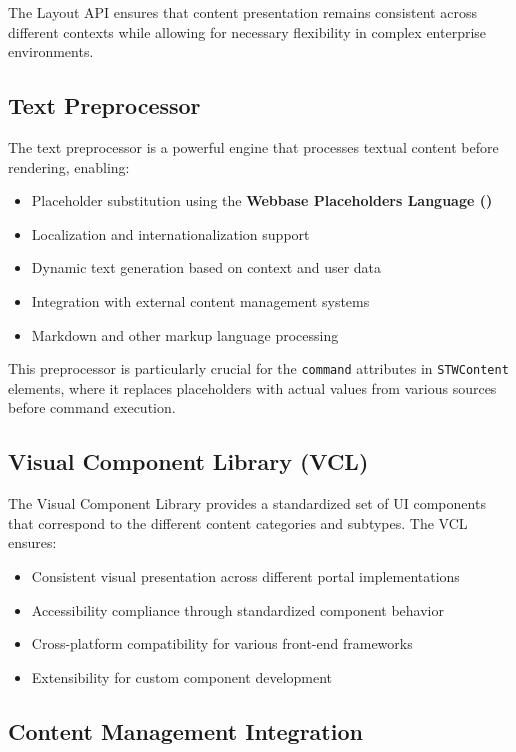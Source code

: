 The Layout API ensures that content presentation remains consistent across different contexts while allowing for necessary flexibility in complex enterprise environments.

\subsection{Text Preprocessor}
\label{sec:text-preprocessor}

The \wbol{} text preprocessor is a powerful engine that processes textual content before rendering, enabling:

\begin{itemize}
\item Placeholder substitution using the \textbf{Webbase Placeholders Language (\wbpl{})}
\item Localization and internationalization support
\item Dynamic text generation based on context and user data
\item Integration with external content management systems
\item Markdown and other markup language processing
\end{itemize}

This preprocessor is particularly crucial for the \texttt{command} attributes in \texttt{STWContent} elements, where it replaces placeholders with actual values from various sources before command execution.

\subsection{Visual Component Library (VCL)}
\label{sec:vcl}

The Visual Component Library provides a standardized set of UI components that correspond to the different content categories and subtypes. The VCL ensures:

\begin{itemize}
\item Consistent visual presentation across different portal implementations
\item Accessibility compliance through standardized component behavior
\item Cross-platform compatibility for various front-end frameworks
\item Extensibility for custom component development
\end{itemize}

\subsection{Content Management Integration}
\label{sec:cms-integration}

